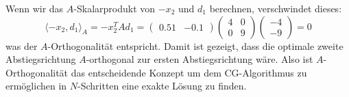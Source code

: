 Wenn wir das $A$-Skalarprodukt von $-x_2$ und $d_1$ berechnen, verschwindet dieses:
\begin{equation}
	\langle -x_2 , d_1 \rangle_A = 	-x_2^T A d_1 = 
		\begin{pmatrix} 0.51 & -0.1 \end{pmatrix} 
		\begin{pmatrix} 4 & 0\\
						0 & 9 
		\end{pmatrix} 
		\begin{pmatrix} -4\\
						-9 
		\end{pmatrix} = 0 \nonumber
\end{equation}
was der $A$-Orthogonalität entspricht.
Damit ist gezeigt, dass die optimale zweite Abstiegsrichtung $A$-orthogonal zur ersten Abstiegsrichtung wäre.
Also ist $A$-Orthogonalität das entscheidende Konzept um dem CG-Algorithmus zu ermöglichen in $N$-Schritten eine exakte Lösung zu finden.